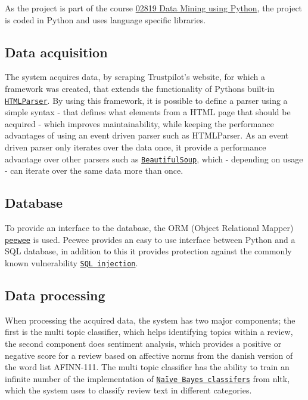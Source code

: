 \documentclass[10pt]{IEEEtran}
\begin{document}
As the project is part of the course \href{http://www.kurser.dtu.dk/02819.aspx?menulanguage=en-GB}{02819 Data Mining using Python}, the project is coded in Python and uses language specific libraries.

\subsection{Data acquisition}
The system acquires data, by scraping Trustpilot's website, for which a framework was created, that extends the functionality of Pythons built-in \href{http://docs.python.org/2/library/htmlparser.html}{\texttt{HTMLParser}}. By using this framework, it is possible to define a parser using a simple syntax - that defines what elements from a HTML page that should be acquired - which improves maintainability, while keeping the performance advantages of using an event driven parser such as HTMLParser. As an event driven parser only iterates over the data once, it provide a performance advantage over other parsers such as \href{http://www.crummy.com/software/BeautifulSoup/}{\texttt{BeautifulSoup}}, which - depending on usage - can iterate over the same data more than once.

\subsection{Database}
To provide an interface to the database, the ORM (Object Relational Mapper) \href{http://peewee.readthedocs.org/en/latest/}{\texttt{peewee}} is used. Peewee provides an easy to use interface between Python and a SQL database, in addition to this it provides protection against the commonly known vulnerability \href{https://www.owasp.org/index.php/Top_10_2013-A1-Injection}{\texttt{SQL injection}}.

\subsection{Data processing}
When processing the acquired data, the system has two major components; the first is the multi topic classifier, which helps identifying topics within a review, the second component does sentiment analysis, which provides a positive or negative score for a review based on affective norms from the danish version of the word list AFINN-111\cite{IMM2011-06010}. The multi topic classifier has the ability to train an infinite number of the implementation of \href{http://nltk.org/api/nltk.classify.html#module-nltk.classify.naivebayes}{\texttt{Naïve Bayes classifers}} from nltk, which the system uses to classify review text in different categories.
\end{document}
